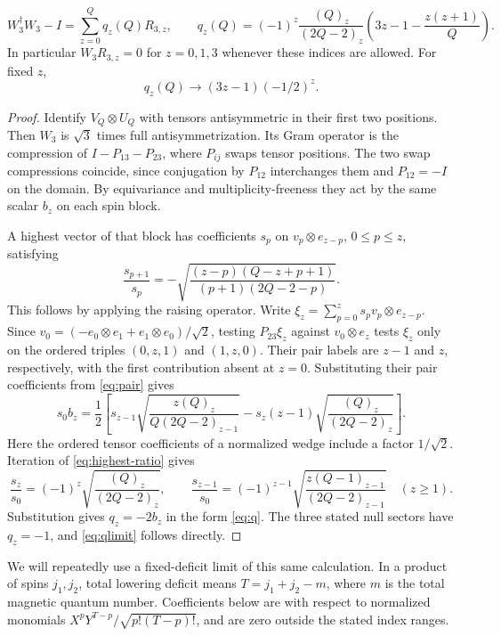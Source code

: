\begin{lemma}\label{lem:q}
\begin{equation}\label{eq:q}
 W_3^\dagger W_3-I=\sum_{z=0}^Qq_z(Q)R_{3,z},\qquad
 q_z(Q)=(-1)^z\frac{(Q)_z}{(2Q-2)_z}
          \left(3z-1-\frac{z(z+1)}Q\right).
\end{equation}
In particular $W_3R_{3,z}=0$ for $z=0,1,3$ whenever these indices are allowed. For fixed $z$,
\begin{equation}\label{eq:qlimit}
 q_z(Q)\longrightarrow (3z-1)(-1/2)^z.
\end{equation}
\end{lemma}
\begin{proof}
Identify $V_Q\otimes U_Q$ with tensors antisymmetric in their first two positions. Then $W_3$ is $\sqrt3$ times full antisymmetrization. Its Gram operator is the compression of $I-P_{13}-P_{23}$, where $P_{ij}$ swaps tensor positions. The two swap compressions coincide, since conjugation by $P_{12}$ interchanges them and $P_{12}=-I$ on the domain. By equivariance and multiplicity-freeness they act by the same scalar $b_z$ on each spin block.

A highest vector of that block has coefficients $s_p$ on $v_p\otimes e_{z-p}$, $0\le p\le z$, satisfying
\begin{equation}\label{eq:highest-ratio}
 \frac{s_{p+1}}{s_p}=-\sqrt{\frac{(z-p)(Q-z+p+1)}{(p+1)(2Q-2-p)}}.
\end{equation}
This follows by applying the raising operator. Write
$\xi_z=\sum_{p=0}^z s_pv_p\otimes e_{z-p}$. Since
$v_0=(-e_0\otimes e_1+e_1\otimes e_0)/\sqrt2$, testing $P_{23}\xi_z$
against $v_0\otimes e_z$ tests $\xi_z$ only on the ordered triples
$(0,z,1)$ and $(1,z,0)$. Their pair labels are $z-1$ and $z$,
respectively, with the first contribution absent at $z=0$.
Substituting their pair coefficients from \eqref{eq:pair} gives
\[
 s_0b_z=\frac12\left[
 s_{z-1}\sqrt{\frac{z(Q)_z}{Q(2Q-2)_{z-1}}}
 -s_z(z-1)\sqrt{\frac{(Q)_z}{(2Q-2)_z}}\right].
\]
Here the ordered tensor coefficients of a normalized wedge include a factor $1/\sqrt2$. Iteration of \eqref{eq:highest-ratio} gives
\[
 \frac{s_z}{s_0}=(-1)^z\sqrt{\frac{(Q)_z}{(2Q-2)_z}},\qquad
 \frac{s_{z-1}}{s_0}=(-1)^{z-1}
 \sqrt{\frac{z(Q-1)_{z-1}}{(2Q-2)_{z-1}}}\quad(z\ge1).
\]
Substitution gives $q_z=-2b_z$ in the form \eqref{eq:q}. The three stated null sectors have $q_z=-1$, and \eqref{eq:qlimit} follows directly.
\end{proof}

We will repeatedly use a fixed-deficit limit of this same calculation. In a product of spins $j_1,j_2$, total lowering deficit means $T=j_1+j_2-m$, where $m$ is the total magnetic quantum number. Coefficients below are with respect to normalized monomials $X^pY^{T-p}/\sqrt{p!(T-p)!}$, and are zero outside the stated index ranges.

